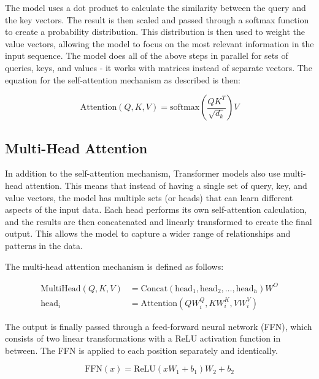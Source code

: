 \documentclass[twoside]{ctuthesis}
\theoremstyle{plain}
\theoremstyle{definition}
\theoremstyle{note}
\begin{document}
The model uses a dot product to calculate the similarity between the query and the key vectors. The result is then scaled and passed through a softmax function to create a probability distribution. This distribution is then used to weight the value vectors, allowing the model to focus on the most relevant information in the input sequence. The model does all of the above steps in parallel for sets of queries, keys, and values - it works with matrices instead of separate vectors. The equation for the self-attention mechanism as described is then:\par

\begin{equation}
	\text{Attention}(Q, K, V) = \text{softmax}\left(\frac{QK^T}{\sqrt{d_k}}\right)V
\end{equation}


\subsection{Multi-Head Attention}

In addition to the self-attention mechanism, Transformer models also use multi-head attention. This means that instead of having a single set of query, key, and value vectors, the model has multiple sets (or heads) that can learn different aspects of the input data. Each head performs its own self-attention calculation, and the results are then concatenated and linearly transformed to create the final output. This allows the model to capture a wider range of relationships and patterns in the data.\par
The multi-head attention mechanism is defined as follows\cite{Vaswani2017}:

\begin{align}
 \text{MultiHead}(Q, K, V) &= \text{Concat}(\text{head}_1, \text{head}_2, \ldots, \text{head}_h)W^O \\
 \text{head}_i &= \text{Attention}(QW_i^Q, KW_i^K, VW_i^V)
\end{align}

The output is finally passed through a feed-forward neural network (FFN), which consists of two linear transformations with a ReLU activation function in between. The FFN is applied to each position separately and identically.\par

\begin{equation}
 \text{FFN}(x) = \text{ReLU}(xW_1 + b_1)W_2 + b_2 
\end{equation}
\end{document}
